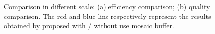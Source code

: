 \documentclass[journal]{IEEEtran}
\begin{document}
\begin{figure}[!t]
    \centering
    \caption{Comparison in different scale: (a) efficiency comparison; (b) quality comparison. The red and blue line respectively represent the results obtained by proposed with / without use mosaic buffer. }
    \label{fig:seamline-efficiency-comparison}
\end{figure}
\end{document}
